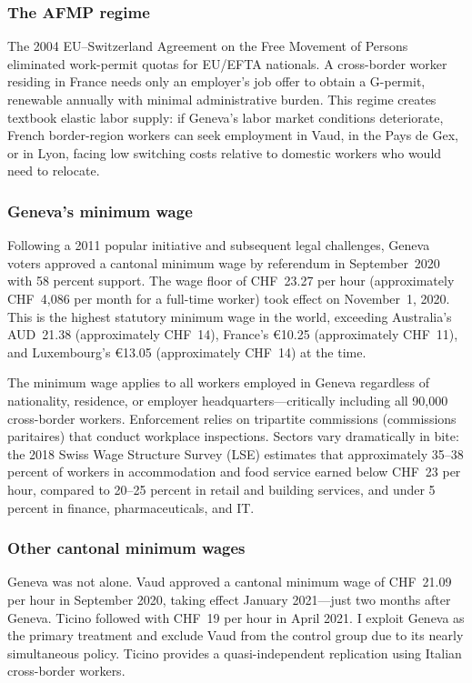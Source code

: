 \documentclass[12pt]{article}
\begin{document}
\subsubsection*{The AFMP regime} The 2004 EU--Switzerland Agreement on the Free Movement of Persons eliminated work-permit quotas for EU/EFTA nationals. A cross-border worker residing in France needs only an employer's job offer to obtain a G-permit, renewable annually with minimal administrative burden. This regime creates textbook elastic labor supply: if Geneva's labor market conditions deteriorate, French border-region workers can seek employment in Vaud, in the Pays de Gex, or in Lyon, facing low switching costs relative to domestic workers who would need to relocate.

\subsubsection*{Geneva's minimum wage} Following a 2011 popular initiative and subsequent legal challenges, Geneva voters approved a cantonal minimum wage by referendum in September~2020 with 58 percent support. The wage floor of CHF~23.27 per hour (approximately CHF~4,086 per month for a full-time worker) took effect on November~1, 2020. This is the highest statutory minimum wage in the world, exceeding Australia's AUD~21.38 (approximately CHF~14), France's \euro{10.25} (approximately CHF~11), and Luxembourg's \euro{13.05} (approximately CHF~14) at the time.

The minimum wage applies to all workers employed in Geneva regardless of nationality, residence, or employer headquarters---critically including all 90,000 cross-border workers. Enforcement relies on tripartite commissions (commissions paritaires) that conduct workplace inspections. Sectors vary dramatically in bite: the 2018 Swiss Wage Structure Survey (LSE) estimates that approximately 35--38 percent of workers in accommodation and food service earned below CHF~23 per hour, compared to 20--25 percent in retail and building services, and under 5 percent in finance, pharmaceuticals, and IT.

\subsubsection*{Other cantonal minimum wages} Geneva was not alone. Vaud approved a cantonal minimum wage of CHF~21.09 per hour in September 2020, taking effect January 2021---just two months after Geneva. Ticino followed with CHF~19 per hour in April 2021. I exploit Geneva as the primary treatment and exclude Vaud from the control group due to its nearly simultaneous policy. Ticino provides a quasi-independent replication using Italian cross-border workers.
\end{document}
